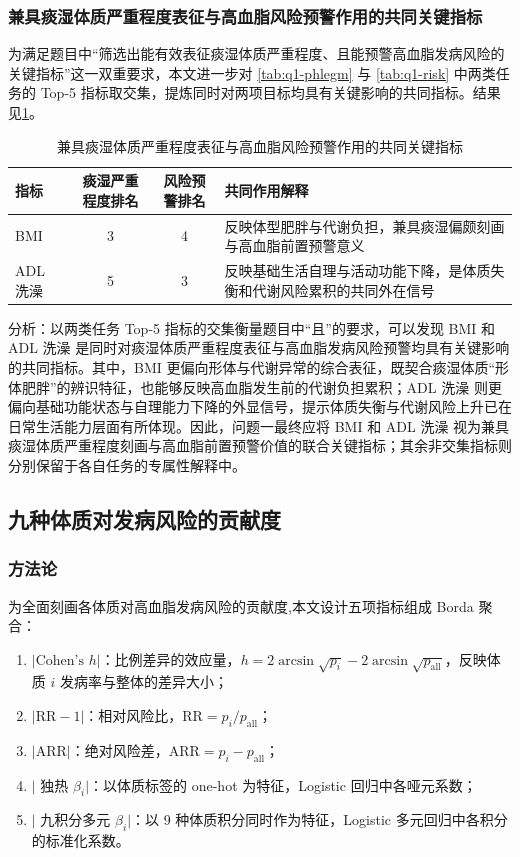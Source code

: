 \documentclass{MathorCupmodeling}
\providecommand{\tightlist}{%
  \setlength{\itemsep}{0pt}\setlength{\parskip}{0pt}}
\begin{document}
\subsubsection{兼具痰湿体质严重程度表征与高血脂风险预警作用的共同关键指标}

为满足题目中“筛选出能有效表征痰湿体质严重程度、且能预警高血脂发病风险的关键指标”这一双重要求，本文进一步对 \cref{tab:q1-phlegm} 与 \cref{tab:q1-risk} 中两类任务的 Top-5 指标取交集，提炼同时对两项目标均具有关键影响的共同指标。结果见\cref{tab:q1-intersection}。

\begin{table}[H]
\centering\small
\caption{兼具痰湿体质严重程度表征与高血脂风险预警作用的共同关键指标}\label{tab:q1-intersection}
\begin{tabular}{@{}l c c p{7.5cm}@{}}
\toprule
指标 & 痰湿严重程度排名 & 风险预警排名 & 共同作用解释 \\
\midrule
BMI & 3 & 4 & 反映体型肥胖与代谢负担，兼具痰湿偏颇刻画与高血脂前置预警意义 \\
ADL 洗澡 & 5 & 3 & 反映基础生活自理与活动功能下降，是体质失衡和代谢风险累积的共同外在信号 \\
\bottomrule
\end{tabular}
\end{table}

分析：以两类任务 Top-5 指标的交集衡量题目中“且”的要求，可以发现 BMI 和 ADL 洗澡 是同时对痰湿体质严重程度表征与高血脂发病风险预警均具有关键影响的共同指标。其中，BMI 更偏向形体与代谢异常的综合表征，既契合痰湿体质“形体肥胖”的辨识特征，也能够反映高血脂发生前的代谢负担累积；ADL 洗澡 则更偏向基础功能状态与自理能力下降的外显信号，提示体质失衡与代谢风险上升已在日常生活能力层面有所体现。因此，问题一最终应将 BMI 和 ADL 洗澡 视为兼具痰湿体质严重程度刻画与高血脂前置预警价值的联合关键指标；其余非交集指标则分别保留于各自任务的专属性解释中。

\subsection{九种体质对发病风险的贡献度}

\subsubsection{方法论}

为全面刻画各体质对高血脂发病风险的贡献度,本文设计五项指标组成 Borda 聚合：

\begin{enumerate}
\def\labelenumi{(\arabic{enumi})}
\tightlist
\item $|\text{Cohen's } h|$：比例差异的效应量，$h = 2\arcsin\sqrt{p_i} - 2\arcsin\sqrt{p_{\text{all}}}$，反映体质 $i$ 发病率与整体的差异大小；
\item $|\text{RR} - 1|$：相对风险比，$\text{RR} = p_i / p_{\text{all}}$；
\item $|\text{ARR}|$：绝对风险差，$\text{ARR} = p_i - p_{\text{all}}$；
\item $|$ 独热 $\beta_i|$：以体质标签的 one-hot 为特征，Logistic 回归中各哑元系数；
\item $|$ 九积分多元 $\beta_i|$：以 9 种体质积分同时作为特征，Logistic 多元回归中各积分的标准化系数。
\end{enumerate}
\end{document}
